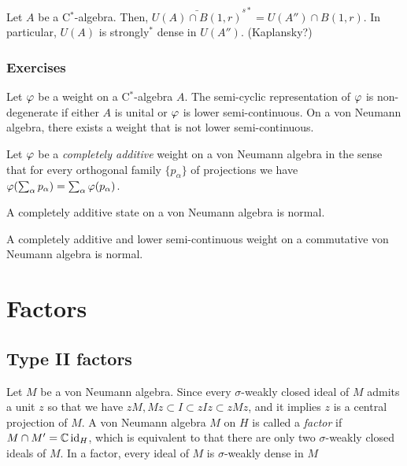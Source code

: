 \documentclass{../../large}
\begin{document}
Let $A$ be a C$^*$-algebra.
Then, $\bar{U(A)\cap B(1,r)}^{s*}=U(A'')\cap B(1,r)$.
In particular, $U(A)$ is strongly$^*$ dense in $U(A'')$.
(Kaplansky?)





\section*{Exercises}
\begin{prb}
Let $\varphi$ be a weight on a C$^*$-algebra $A$.
The semi-cyclic representation of $\varphi$ is non-degenerate if either $A$ is unital or $\varphi$ is lower semi-continuous.
On a von Neumann algebra, there exists a weight that is not lower semi-continuous.
\end{prb}

\begin{prb}
Let $\varphi$ be a \emph{completely additive} weight on a von Neumann algebra in the sense that for every orthogonal family $\{p_\alpha\}$ of projections we have $\varphi(\sum_\alpha p_\alpha)=\sum_\alpha\varphi(p_\alpha)$.
\begin{parts}
\item A completely additive state on a von Neumann algebra is normal.
\item A completely additive and lower semi-continuous weight on a commutative von Neumann algebra is normal.
\end{parts}
\end{prb}








\part{Factors}

\chapter{Type II factors}

\begin{prb}
Let $M$ be a von Neumann algebra.
Since every $\sigma$-weakly closed ideal of $M$ admits a unit $z$ so that we have $zM,Mz\subset I\subset zIz\subset zMz$, and it implies $z$ is a central projection of $M$.
A von Neumann algebra $M$ on $H$ is called a \emph{factor} if $M\cap M'=\mathbb{C}\operatorname{id}_H$, which is equivalent to that there are only two $\sigma$-weakly closed ideals of $M$.
In a factor, every ideal of $M$ is $\sigma$-weakly dense in $M$
\end{prb}
\end{document}
